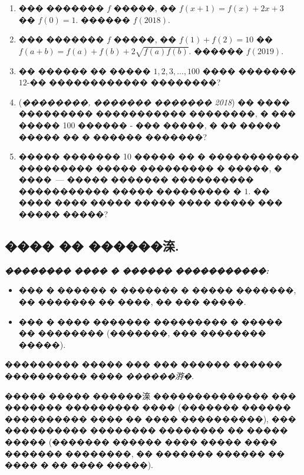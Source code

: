 \documentclass[a4paper,12pt]{article}
\begin{document}
\begin{enumerate}
\item ��� ������� $f$ �����, �� $f(x+1)=f(x)+2x+3$ �� $f(0)=1$. ������ $f(2018)$.

\item ��� ������� $f$ �����, �� $f(1)+f(2)=10$ �� $f(a+b)=f(a)+f(b)+2\sqrt{f(a)f(b)}$. ������ $f(2019)$.

\item �� ������ �� ����� $1,2,3,...,100$ ���� ������� $12$-�� ������������ ��������?

\item (\textit{��������, ������� ������� 2018}) �� ���� ��������� ����������� ��������, � ��� ����� 100 ������ - ��� �����, � �� ����� ����� �� � ������ �������?

\item ����� ������� 10 ����� �� � ����������� ��������� ����� ��������� � �����, � ����~--- ����� ������� ���������� ����������� ����� ��������� � $1$. �� ���� ���� ����� ����� ���� ����� ��� ����� �����?
\end{enumerate}









\newpage

\begin{center}
\section*{���� �� ������㳿.}
\end{center}

\textit{\textbf{�������� ���� � ������ �����������: }}

\begin{itemize}

\item ��� � ������ � ������� � ����� �������, �� ������� �� ����, �� ��� �����.

\item ��� � ���� ������� ��������� � ����� �� �������� (�������, ��� �������� �����).
\end{itemize}

��������� ����� ��� ��� ������ ������ ���������� ���� \textit{������㳺�}.

����� ����� ������㳿 �������������� ��� ������� ��������� ���� (������� ������ ���������� ���� �� ���� ����������), ��� ���������� �������� �������� �� ����� ����� (������� ������ ���� ����� ���� ������� ��������, �� ������� ������ �� ���� � �� ���� �����).
\end{document}
